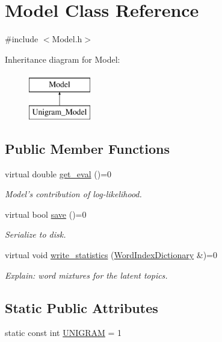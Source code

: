 \hypertarget{class_model}{
\section{Model Class Reference}
\label{class_model}
}


{\ttfamily \#include $<$Model.h$>$}

Inheritance diagram for Model:\begin{figure}[H]
\begin{center}
\leavevmode
\includegraphics[height=2cm]{class_model}
\end{center}
\end{figure}
\subsection*{Public Member Functions}
\begin{DoxyCompactItemize}
\item 
virtual double \hyperlink{class_model_a36d3376040155630afbfcbdc3160c839}{get\_\-eval} ()=0
\begin{DoxyCompactList}\small\item\em Model's contribution of log-\/likelihood. \item\end{DoxyCompactList}\item 
virtual bool \hyperlink{class_model_a9eb67634d1cbfbbe5758571e230834d4}{save} ()=0
\begin{DoxyCompactList}\small\item\em Serialize to disk. \item\end{DoxyCompactList}\item 
virtual void \hyperlink{class_model_a166812818e0039417ddeeb661c8bafec}{write\_\-statistics} (\hyperlink{class_word_index_dictionary}{WordIndexDictionary} \&)=0
\begin{DoxyCompactList}\small\item\em Explain: word mixtures for the latent topics. \item\end{DoxyCompactList}\end{DoxyCompactItemize}
\subsection*{Static Public Attributes}
\begin{DoxyCompactItemize}
\item 
static const int \hyperlink{class_model_a84d38ec3409863e98cf31d9b311c5008}{UNIGRAM} = 1
\end{DoxyCompactItemize}


